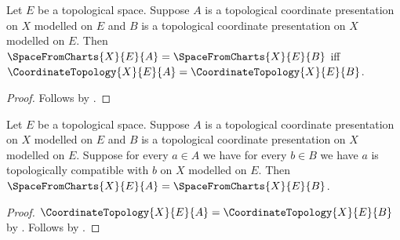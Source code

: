 \begin{theorem}\label{space_from_charts_equal_iff}
    Let $E$ be a topological space.
    Suppose $A$ is a topological coordinate presentation on $X$ modelled on $E$ and
        $B$ is a topological coordinate presentation on $X$ modelled on $E$.
    Then $\SpaceFromCharts{X}{E}{A}=\SpaceFromCharts{X}{E}{B}$ iff
        $\CoordinateTopology{X}{E}{A}=\CoordinateTopology{X}{E}{B}$.
\end{theorem}
\begin{proof}
    Follows by .
\end{proof}

\begin{theorem}\label{space_from_cross_compatible_charts}
    Let $E$ be a topological space.
    Suppose $A$ is a topological coordinate presentation on $X$ modelled on $E$ and
        $B$ is a topological coordinate presentation on $X$ modelled on $E$.
    Suppose for every $a\in A$ we have for every $b\in B$ we have
        $a$ is topologically compatible with $b$ on $X$ modelled on $E$.
    Then $\SpaceFromCharts{X}{E}{A}=\SpaceFromCharts{X}{E}{B}$.
\end{theorem}
\begin{proof}
    $\CoordinateTopology{X}{E}{A}=\CoordinateTopology{X}{E}{B}$ by
        .
    Follows by .
\end{proof}
